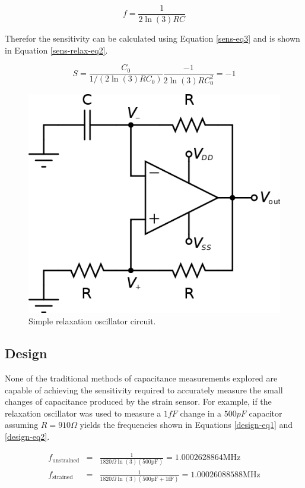 \begin{equation}
	f=\frac{1}{2\ln(3)RC}\label{sens-relax-eq1}
\end{equation} 

Therefor the sensitivity can be calculated using Equation \ref{sens-eq3} and is shown in Equation \ref{sens-relax-eq2}.

\begin{equation}
	S=\frac{C_0}{1/(2\ln(3)RC_0)}\frac{-1}{2\ln(3)RC_0^2}=-1\label{sens-relax-eq2}
\end{equation}

\begin{figure}
	\begin{center}
		\includegraphics[width=.6\textwidth]{Images/RelaxationOsc.png}
		\caption{Simple relaxation oscillator circuit.\label{simp-relax-osc}}
	\end{center}
\end{figure}

\subsection{Design}
None of the traditional methods of capacitance measurements explored are capable of achieving the sensitivity required to accurately measure the small changes of capacitance produced by the strain sensor.  For example, if the relaxation oscillator was used to measure a $1fF$ change in a $500pF$ capacitor assuming $R=910\Omega$ yields the frequencies shown in Equations \ref{design-eq1} and \ref{design-eq2}.

\begin{eqnarray}
	f_{\text{unstrained}}&=&\frac{1}{1820\Omega\ln(3)(500\text{pF})}=1.0002628864 \text{MHz}\label{design-eq1}\\
	f_{\text{strained}}&=&\frac{1}{1820\Omega\ln(3)(500\text{pF}+1\text{fF})}=1.00026088588 \text{MHz}\label{design-eq2}
\end{eqnarray}

